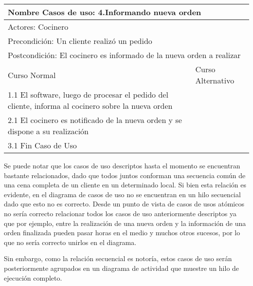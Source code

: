 \documentclass[a4paper,10pt]{article}
\begin{document}
\bigskip

\begin{center}
\begin{tabularx}{14cm}{|X|X|}
\hline
\multicolumn{2}{|l|}{Nombre Casos de uso: 4.Informando nueva orden}\\
\hline
\multicolumn{2}{|l|}{Actores: Cocinero}\\
\hline
\multicolumn{2}{|l|}{Precondici\'on: Un cliente realiz\'o un pedido}\\
\hline
\multicolumn{2}{|l|}{Postcondici\'on: El cocinero es informado de la nueva orden a realizar}\\
\hline
Curso Normal & Curso Alternativo\\
\hline
1.1 El software, luego de procesar el pedido del cliente, informa al cocinero sobre la nueva orden & 
\\
\hline
2.1 El cocinero es notificado de la nueva orden y se dispone a su realizaci\'on & 
\\
\hline
3.1 Fin Caso de Uso
\\
\hline
\end{tabularx}
\end{center}


\medskip

Se puede notar que los casos de uso descriptos hasta el momento se encuentran bastante relacionados, dado que todos juntos conforman una secuencia
com\'un de una cena completa de un cliente en un determinado local. Si bien esta relaci\'on es evidente, en el diagrama de casos de uso no se encuentran
en un hilo secuencial dado que esto no es correcto. Desde un punto de vista de casos de usos at\'omicos no ser\'ia correcto relacionar todos los casos de uso
anteriormente descriptos ya que por ejemplo, entre la realizaci\'on de una nueva orden y la informaci\'on de una orden finalizada pueden pasar horas
en el medio y muchos otros sucesos, por lo que no ser\'ia correcto unirlos en el diagrama.


Sin embargo, como la relaci\'on secuencial es notor\'ia, estos casos de uso ser\'an posteriormente agrupados en un diagrama de actividad que muestre
un hilo de ejecuci\'on completo.

\bigskip
\end{document}
